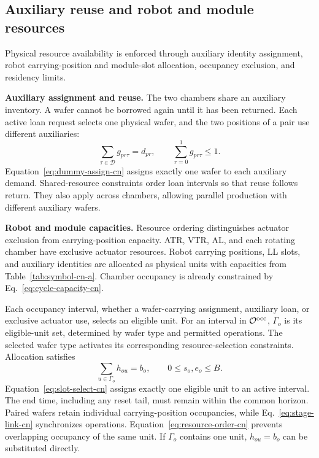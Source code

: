 \documentclass[final,5p,times,twocolumn]{elsarticle}
\begin{document}
\subsection{Auxiliary reuse and robot and module resources}
\label{sec:model-resource-cn}
Physical resource availability is enforced through auxiliary identity assignment, robot carrying-position and module-slot allocation, occupancy exclusion, and residency limits.

\noindent\textbf{Auxiliary assignment and reuse.}
The two chambers share an auxiliary inventory. A wafer cannot be borrowed again until it has been returned. Each active loan request selects one physical wafer, and the two positions of a pair use different auxiliaries:
\begin{equation}
\sum_{\tau\in\mathcal D}g_{pr\tau}=d_{pr},\qquad
\sum_{r=0}^{1}g_{pr\tau}\le1.
\label{eq:dummy-assign-cn}
\end{equation}
Equation~\eqref{eq:dummy-assign-cn} assigns exactly one wafer to each auxiliary demand. Shared-resource constraints order loan intervals so that reuse follows return. They also apply across chambers, allowing parallel production with different auxiliary wafers.

\noindent\textbf{Robot and module capacities.}
Resource ordering distinguishes actuator exclusion from carrying-position capacity. ATR, VTR, AL, and each rotating chamber have exclusive actuator resources. Robot carrying positions, LL slots, and auxiliary identities are allocated as physical units with capacities from Table~\ref{tab:symbol-cn-a}. Chamber occupancy is already constrained by Eq.~\eqref{eq:cycle-capacity-cn}.

Each occupancy interval, whether a wafer-carrying assignment, auxiliary loan, or exclusive actuator use, selects an eligible unit. For an interval in $\mathcal O^{\rm occ}$, $\Gamma_o$ is its eligible-unit set, determined by wafer type and permitted operations. The selected wafer type activates its corresponding resource-selection constraints. Allocation satisfies
\begin{equation}
\sum_{u\in\Gamma_o}h_{ou}=b_o,\qquad 0\le s_o,e_o\le B.
\label{eq:slot-select-cn}
\end{equation}
Equation~\eqref{eq:slot-select-cn} assigns exactly one eligible unit to an active interval. The end time, including any reset tail, must remain within the common horizon. Paired wafers retain individual carrying-position occupancies, while Eq.~\eqref{eq:stage-link-cn} synchronizes operations. Equation~\eqref{eq:resource-order-cn} prevents overlapping occupancy of the same unit. If $\Gamma_o$ contains one unit, $h_{ou}=b_o$ can be substituted directly.
\end{document}
